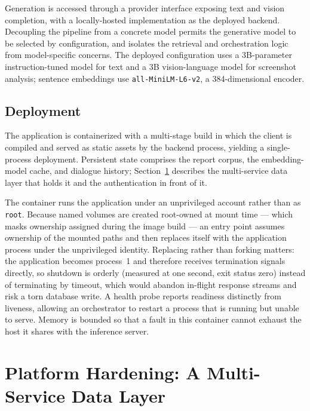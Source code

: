 \documentclass[12pt, a4paper]{article}
\begin{document}
Generation is accessed through a provider interface exposing text and vision completion, with a locally-hosted implementation as the deployed backend. Decoupling the pipeline from a concrete model permits the generative model to be selected by configuration, and isolates the retrieval and orchestration logic from model-specific concerns. The deployed configuration uses a 3B-parameter instruction-tuned model for text and a 3B vision-language model for screenshot analysis; sentence embeddings use \texttt{all-MiniLM-L6-v2}, a 384-dimensional encoder.

\subsection{Deployment}

The application is containerized with a multi-stage build in which the client is compiled and served as static assets by the backend process, yielding a single-process deployment. Persistent state comprises the report corpus, the embedding-model cache, and dialogue history; Section~\ref{sec:hardening} describes the multi-service data layer that holds it and the authentication in front of it.

The container runs the application under an unprivileged account rather than as \texttt{root}. Because named volumes are created root-owned at mount time --- which masks ownership assigned during the image build --- an entry point assumes ownership of the mounted paths and then replaces itself with the application process under the unprivileged identity. Replacing rather than forking matters: the application becomes process~1 and therefore receives termination signals directly, so shutdown is orderly (measured at one second, exit status zero) instead of terminating by timeout, which would abandon in-flight response streams and risk a torn database write. A health probe reports readiness distinctly from liveness, allowing an orchestrator to restart a process that is running but unable to serve. Memory is bounded so that a fault in this container cannot exhaust the host it shares with the inference server.

\section{Platform Hardening: A Multi-Service Data Layer}
\label{sec:hardening}
\end{document}
